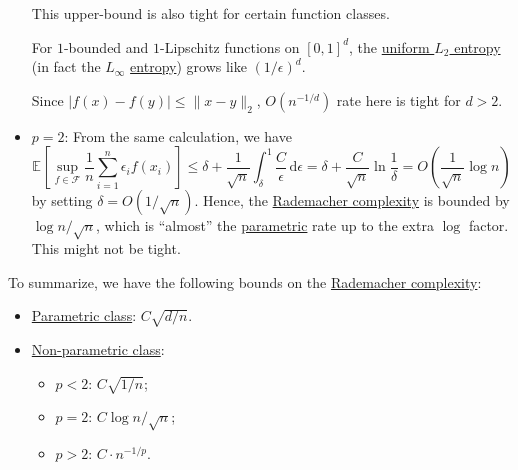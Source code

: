 \begin{itemize}
	      This upper-bound is also tight for certain function classes.
	      \begin{eg}
		      For \(1\)-bounded and \(1\)-Lipschitz functions on \([0, 1]^d\), the \hyperref[def:Koltchinskii-Pollard-entropy]{uniform \(L_2\) entropy} (in fact the \(L_\infty \) \hyperref[def:metric-entropy]{entropy}) grows like \((1 / \epsilon )^d\).
	      \end{eg}
	      \begin{explanation}
		      Since \(\vert f(x) - f(y) \vert \leq \lVert x - y \rVert _2\), \(O(n^{-1 / d})\) rate here is tight for \(d > 2\).
	      \end{explanation}
	\item \(p = 2\): From the same calculation, we have
	      \[
		      \mathbb{E}_{}\left[\sup _{f\in \mathscr{F} } \frac{1}{n}\sum_{i=1}^{n} \epsilon _i f(x_i) \right]
		      \leq \delta + \frac{1}{\sqrt{n} } \int_{\delta }^{1} \frac{C}{\epsilon } \,\mathrm{d}\epsilon
		      = \delta + \frac{C}{\sqrt{n} } \ln \frac{1}{\delta}
		      = O\left( \frac{1}{\sqrt{n} } \log n \right)
	      \]
	      by setting \(\delta = O(1 / \sqrt{n} )\). Hence, the \hyperref[def:Rademacher-complexity]{Rademacher complexity} is bounded by \(\log n / \sqrt{n} \), which is ``almost'' the \hyperref[def:parametric]{parametric} rate up to the extra \(\log \) factor. This might not be tight.
\end{itemize}

\begin{remark}
	To summarize, we have the following bounds on the \hyperref[def:Rademacher-complexity]{Rademacher complexity}:
	\begin{itemize}
		\item \hyperref[def:parametric]{Parametric class}: \(C \sqrt{d / n} \).
		\item \hyperref[def:non-parametric]{Non-parametric class}:
		      \begin{itemize}
			      \item \(p < 2\): \(C \sqrt{1 / n} \);
			      \item \(p = 2\): \(C \log n / \sqrt{n} \);
			      \item \(p > 2\): \(C \cdot n^{-1 / p}\).
		      \end{itemize}
	\end{itemize}
\end{remark}

